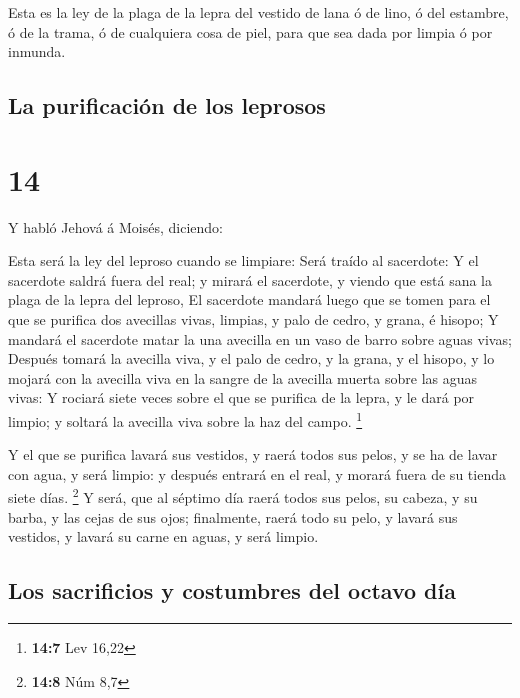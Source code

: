  Esta es la ley de la plaga de la lepra del vestido de lana
ó de lino, ó del estambre, ó de la trama, ó de cualquiera cosa de piel,
para que sea dada por limpia ó por inmunda.

\hypertarget{la-purificaciuxf3n-de-los-leprosos}{%
\subsection{La purificación de los
leprosos}\label{la-purificaciuxf3n-de-los-leprosos}}

\hypertarget{section-13}{%
\section{14}\label{section-13}}

 Y habló Jehová á Moisés, diciendo:

 Esta será la ley del leproso cuando se limpiare: Será
traído al sacerdote:  Y el sacerdote saldrá fuera del real;
y mirará el sacerdote, y viendo que está sana la plaga de la lepra del
leproso,  El sacerdote mandará luego que se tomen para el
que se purifica dos avecillas vivas, limpias, y palo de cedro, y grana,
é hisopo;  Y mandará el sacerdote matar la una avecilla en
un vaso de barro sobre aguas vivas;  Después tomará la
avecilla viva, y el palo de cedro, y la grana, y el hisopo, y lo mojará
con la avecilla viva en la sangre de la avecilla muerta sobre las aguas
vivas:  Y rociará siete veces sobre el que se purifica de la
lepra, y le dará por limpio; y soltará la avecilla viva sobre la haz del
campo. \footnote{\textbf{14:7} Lev 16,22}

 Y el que se purifica lavará sus vestidos, y raerá todos sus
pelos, y se ha de lavar con agua, y será limpio: y después entrará en el
real, y morará fuera de su tienda siete días. \footnote{\textbf{14:8}
  Núm 8,7}  Y será, que al séptimo día raerá todos sus
pelos, su cabeza, y su barba, y las cejas de sus ojos; finalmente, raerá
todo su pelo, y lavará sus vestidos, y lavará su carne en aguas, y será
limpio.

\hypertarget{los-sacrificios-y-costumbres-del-octavo-duxeda}{%
\subsection{Los sacrificios y costumbres del octavo
día}\label{los-sacrificios-y-costumbres-del-octavo-duxeda}}

